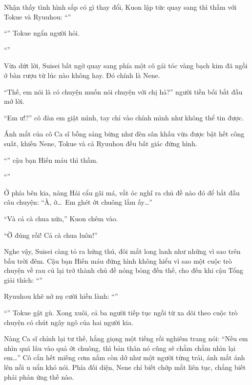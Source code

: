 \documentclass[../main.tex]{subfiles}
\begin{document}
Nhận thấy tình hình sắp có gì thay đổi, Kuon lập tức quay sang thì thầm với Tokue và Ryuuhou: ``''

``'' Tokue ngẩn người hỏi.

``''

Vừa dứt lời, Suisei bất ngờ quay sang phía một cô gái tóc vàng bạch kim đã ngồi ở bàn rượu từ lúc nào không hay. Đó chính là Nene.


``Thế, em nói là có chuyện muốn nói chuyện với chị hả?'' người tiền bối bắt đầu mở lời.

``Em ư!?'' cô đàn em giật mình, tay chỉ vào chính mình như không thể tin được.

Ánh mắt của cô Ca sĩ bỗng sáng bừng như đèn sân khấu vừa được bật hết công suất, khiến Nene, Tokue và cả Ryuuhou đều bất giác đứng hình.

``'' cậu bạn Hiến máu thì thầm.

``''

Ở phía bên kia, nàng Hải cẩu gãi má, vắt óc nghĩ ra chủ đề nào đó để bắt đầu câu chuyện: ``À, ờ\dots\ Em ghét ớt chuông lắm ấy\dots''

``Và cả cà chua nữa,'' Kuon chêm vào.

``Ờ đúng rồi! Cả cà chua luôn!''

Nghe vậy, Suisei càng tỏ ra hứng thú, đôi mắt long lanh như những vì sao trên bầu trời đêm. Cậu bạn Hiến máu đứng hình không hiểu vì sao một cuộc trò chuyện về rau củ lại trở thành chủ đề nóng bỏng đến thế, cho đến khi cậu Tổng giải thích: ``''

Ryuuhou khẽ nở nụ cười hiền lành: ``''

``'' Tokue gật gù. Xong xuôi, cả ba người tiếp tục ngồi từ xa dõi theo cuộc trò chuyện có chút ngây ngô của hai người kia.

Nàng Ca sĩ chỉnh lại tư thế, hắng giọng một tiếng rồi nghiêm trang nói: ``Nếu em nhìn quá lâu vào quả ớt chuông, thì bản thân nó cũng sẽ chằm chằm nhìn lại em\dots'' Cô cắn hết miếng cơm nắm còn dở như một người từng trải, ánh mắt ánh lên nỗi u uẩn khó nói. Phía đối diện, Nene chỉ biết chớp mắt liên tục, chẳng biết phải phản ứng thế nào.
\end{document}

